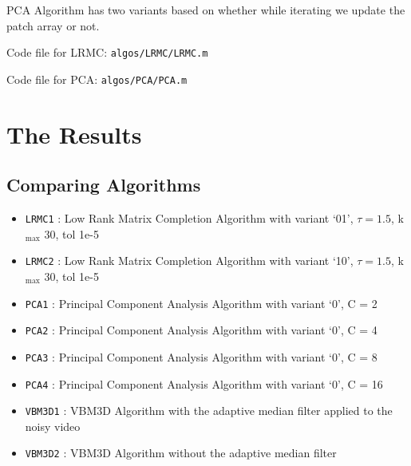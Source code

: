 \documentclass[fleqn, 11pt]{article}
\begin{document}
PCA Algorithm has two variants based on whether while iterating we update the patch array or not.

\bigskip

Code file for LRMC: \texttt{algos/LRMC/LRMC.m}

Code file for PCA: \texttt{algos/PCA/PCA.m}


\newpage 

\section*{The Results}

\subsection*{Comparing Algorithms}

\begin{itemize}[noitemsep]
    \item \texttt{LRMC1} : Low Rank Matrix Completion Algorithm with variant `01', $\tau = 1.5$, k$_\text{max}$ 30, tol 1e-5
    \item \texttt{LRMC2} : Low Rank Matrix Completion Algorithm with variant `10', $\tau = 1.5$, k$_\text{max}$ 30, tol 1e-5
    \item \texttt{PCA1} : Principal Component Analysis Algorithm with variant `0', C = 2
    \item \texttt{PCA2} : Principal Component Analysis Algorithm with variant `0', C = 4
    \item \texttt{PCA3} : Principal Component Analysis Algorithm with variant `0', C = 8
    \item \texttt{PCA4} : Principal Component Analysis Algorithm with variant `0', C = 16
    \item \texttt{VBM3D1} : VBM3D Algorithm with the adaptive median filter applied to the noisy video
    \item \texttt{VBM3D2} : VBM3D Algorithm without the adaptive median filter
\end{itemize}
\end{document}
